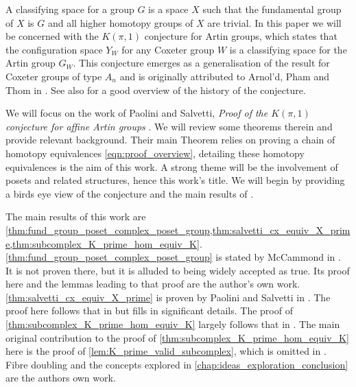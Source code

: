 \documentclass[class=guthesis, crop=false]{standalone}
\begin{document}
A classifying space for a group $G$ is a space $X$ such that the fundamental group of $X$ is $G$ and all higher homotopy groups of $X$ are trivial.
In this paper we will be concerned with the $K(\pi,1)$ conjecture for Artin groups, which states that the configuration space $Y_W$ for any Coxeter group $W$ is a classifying space for the Artin group $G_W$.  This conjecture emerges as a generalisation of the result for Coxeter groups of type $A_n$ and is originally attributed to Arnol'd, Pham and Thom in \cite{lek_homotopy_1983}. See also \cite{charney_davis_pi_1995} for a good overview of the history of the conjecture.

We will focus on the work of Paolini and Salvetti, \emph{Proof of the $K(\pi, 1)$ conjecture for affine Artin groups} \cite{paolini_salvetti_kpi1_2021}. We will review some theorems therein and provide relevant background. Their main Theorem relies on proving a chain of homotopy equivalences \eqref{eqn:proof_overview}, detailing these homotopy equivalences is the aim of this work. A strong theme will be the involvement of posets and related structures, hence this work's title. We will begin by providing a birds eye view of the conjecture and the  main results of \cite{paolini_salvetti_kpi1_2021}.

The main results of this work are \cref{thm:fund_group_poset_complex_poset_group,thm:salvetti_cx_equiv_X_prime,thm:subcomplex_K_prime_hom_equiv_K}.
\cref{thm:fund_group_poset_complex_poset_group} is stated by McCammond in \cite{mccammond_introduction_2005}. It is not proven there, but it is alluded to being widely accepted as true. Its proof here and the lemmas leading to that proof are the author's own work.
\cref{thm:salvetti_cx_equiv_X_prime} is proven by Paolini and Salvetti in \cite{paolini_salvetti_kpi1_2021}. The proof here follows that in \cite{paolini_salvetti_kpi1_2021} but fills in significant details.
The proof of \cref{thm:subcomplex_K_prime_hom_equiv_K} largely follows that in \cite{paolini_salvetti_kpi1_2021}. The main original contribution to the proof of \cref{thm:subcomplex_K_prime_hom_equiv_K} here is the proof of \cref{lem:K_prime_valid_subcomplex}, which is omitted in \cite{paolini_salvetti_kpi1_2021}.
Fibre doubling and the concepts explored in \cref{chap:ideas_exploration_conclusion} are the authors own work.
\end{document}

